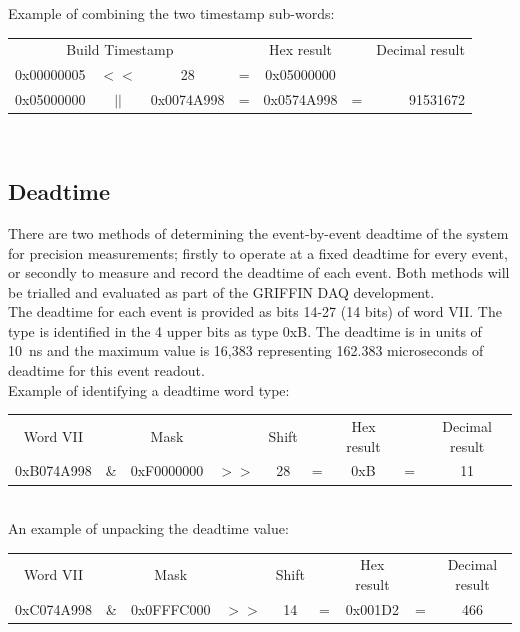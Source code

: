 \documentclass[letterpaper,12pt,notitlepage]{report}
\begin{document}
Example of combining the two timestamp sub-words:\\

\begin{tabular}{ccccccr}
\multicolumn{3}{c}{Build Timestamp} & & Hex result & & Decimal result\\
0x00000005 & $<<$ & 28 & = & 0x05000000\\
0x05000000 & $||$ & 0x0074A998 & = & 0x0574A998 & = & 91531672\\
\end{tabular}\\


\subsection{Deadtime}
There are two methods of determining the event-by-event deadtime of the system for precision measurements; firstly to operate at a fixed deadtime for every event, or secondly to measure and record the deadtime of each event. Both methods will be trialled and evaluated as part of the GRIFFIN DAQ development.\\

The deadtime for each event is provided as bits 14-27 (14 bits) of word VII. The type is identified in the 4 upper bits as type 0xB. The deadtime is in units of 10~ns and the maximum value is 16,383 representing 162.383 microseconds of deadtime for this event readout.\\

Example of identifying a deadtime word type:\\

\begin{tabular}{ccccccccc}
Word VII &  & Mask & & Shift & & Hex result & & Decimal result\\
0xB074A998 & \& & 0xF0000000 & $>>$ & 28 & = & 0xB & = & 11\\
\end{tabular}\\

An example of unpacking the deadtime value:\\

\begin{tabular}{ccccccccc}
Word VII &  & Mask & & Shift & & Hex result & & Decimal result\\
0xC074A998 & \& & 0x0FFFC000 & $>>$ & 14 & = & 0x001D2 & = & 466\\
\end{tabular}\\
\end{document}
